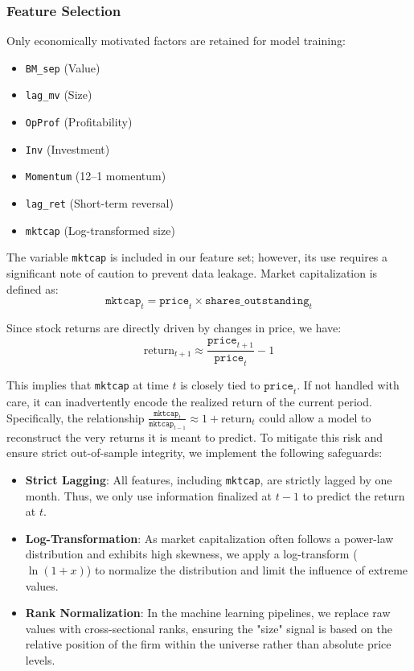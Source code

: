 \documentclass[11pt]{article}
\begin{document}
\subsubsection{Feature Selection}

Only economically motivated factors are retained for model training:
\begin{itemize}
    \item \texttt{BM\_sep} (Value)
    \item \texttt{lag\_mv} (Size)
    \item \texttt{OpProf} (Profitability)
    \item \texttt{Inv} (Investment)
    \item \texttt{Momentum} (12--1 momentum)
    \item \texttt{lag\_ret} (Short-term reversal)
    \item \texttt{mktcap} (Log-transformed size)
\end{itemize}

The variable \texttt{mktcap} is included in our feature set; however, its use requires a significant note of caution to prevent data leakage. Market capitalization is defined as:
\[
\texttt{mktcap}_t = \texttt{price}_t \times \texttt{shares\_outstanding}_t
\]

Since stock returns are directly driven by changes in price, we have:
\[
\text{return}_{t+1} \approx \frac{\texttt{price}_{t+1}}{\texttt{price}_t} - 1
\]

This implies that \texttt{mktcap} at time $t$ is closely tied to $\texttt{price}_t$. If not handled with care, it can inadvertently encode the realized return of the current period. Specifically, the relationship $\frac{\texttt{mktcap}_t}{\texttt{mktcap}_{t-1}} \approx 1 + \text{return}_t$ could allow a model to reconstruct the very returns it is meant to predict. To mitigate this risk and ensure strict out-of-sample integrity, we implement the following safeguards:

\begin{itemize}
    \item \textbf{Strict Lagging}: All features, including \texttt{mktcap}, are strictly lagged by one month. Thus, we only use information finalized at $t-1$ to predict the return at $t$.
    \item \textbf{Log-Transformation}: As market capitalization often follows a power-law distribution and exhibits high skewness, we apply a log-transform ($\ln(1 + x)$) to normalize the distribution and limit the influence of extreme values.
    \item \textbf{Rank Normalization}: In the machine learning pipelines, we replace raw values with cross-sectional ranks, ensuring the "size" signal is based on the relative position of the firm within the universe rather than absolute price levels.
\end{itemize}
\end{document}
